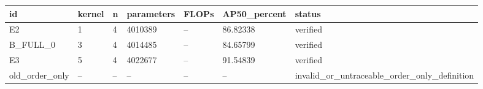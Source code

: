 \begin{tabular}{lllllll}
\hline
id & kernel & n & parameters & FLOPs & AP50\_percent & status \\
\hline
E2 & 1 & 4 & 4010389 & -- & 86.82338 & verified \\
B\_FULL\_0 & 3 & 4 & 4014485 & -- & 84.65799 & verified \\
E3 & 5 & 4 & 4022677 & -- & 91.54839 & verified \\
old\_order\_only & -- & -- & -- & -- & -- & invalid\_or\_untraceable\_order\_only\_definition \\
\hline
\end{tabular}
